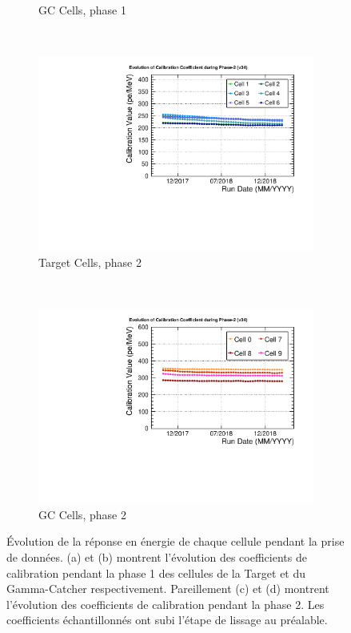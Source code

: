 {\begin{figure}[h!]
\begin{subfigure}[b]{0.49\textwidth}
\caption{GC Cells, phase 1}
\label{fig:CC_running_GC_p1.pdf}
\end{subfigure}
~ %
\begin{subfigure}[b]{0.49\textwidth}
\centering
\includegraphics[width=1\textwidth]{images/CC_running_T_p2.pdf}
\caption{Target Cells, phase 2}
\label{fig:CC_running_T_p2.pdf}
\end{subfigure}
~ %
\begin{subfigure}[b]{0.49\textwidth}
\centering
\includegraphics[width=1\textwidth]{images/CC_running_GC_p2.pdf}
\caption{GC Cells, phase 2}
\label{fig:CC_running_GC_p2.pdf}
\end{subfigure}
  \caption[Évolution de la réponse en énergie de chaque cellule pendant la prise de données]{Évolution de la réponse en énergie de chaque cellule pendant la prise de données. (a) et (b) montrent l'évolution des coefficients de calibration pendant la phase 1 des cellules de la Target et du Gamma-Catcher respectivement. Pareillement (c) et (d) montrent l'évolution des coefficients de calibration pendant la phase 2. Les coefficients échantillonnés ont subi l'étape de lissage au préalable.}
  \label{fig:CC_vs_time}
\end{figure}

\clearpage

}

